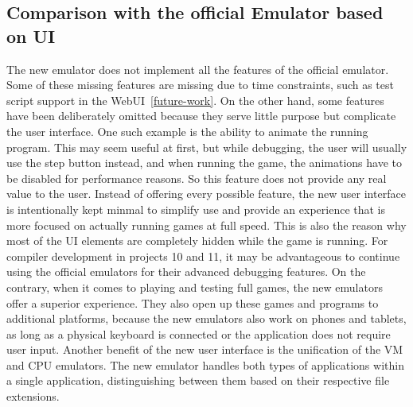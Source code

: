 \subsection{Comparison with the official Emulator based on UI}
The new emulator does not implement all the features of the official emulator. Some of these missing features are missing due to time constraints, such as test script support in the WebUI~\ref{future-work}. On the other hand, some features have been deliberately omitted because they serve little purpose but complicate the user interface.
One such example is the ability to animate the running program. This may seem useful at first, but while debugging, the user will usually use the step button instead, and when running the game, the animations have to be disabled for performance reasons. So this feature does not provide any real value to the user.
Instead of offering every possible feature, the new user interface is intentionally kept minmal to simplify use and provide an experience that is more focused on actually running games at full speed. This is also the reason why most of the UI elements are completely hidden while the game is running.
For compiler development in projects 10 and 11, it may be advantageous to continue using the official emulators for their advanced debugging features.
On the contrary, when it comes to playing and testing full games, the new emulators offer a superior experience. They also open up these games and programs to additional platforms, because the new emulators also work on phones and tablets, as long as a physical keyboard is connected or the application does not require user input.
Another benefit of the new user interface is the unification of the VM and CPU emulators. The new emulator handles both types of applications within a single application, distinguishing between them based on their respective file extensions.


